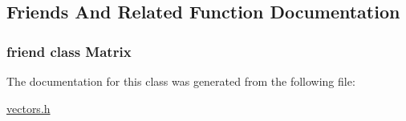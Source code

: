 \subsection{Friends And Related Function Documentation}
\hypertarget{classVec4f_a34913a9261681f734171a6da06bd56fe}{
\subsubsection[{Matrix}]{\setlength{\rightskip}{0pt plus 5cm}friend class {\bf Matrix}\hspace{0.3cm}{\ttfamily [friend]}}}\label{classVec4f_a34913a9261681f734171a6da06bd56fe}


The documentation for this class was generated from the following file\+:\begin{DoxyCompactItemize}
\item 
\hyperlink{vectors_8h}{vectors.\+h}\end{DoxyCompactItemize}
